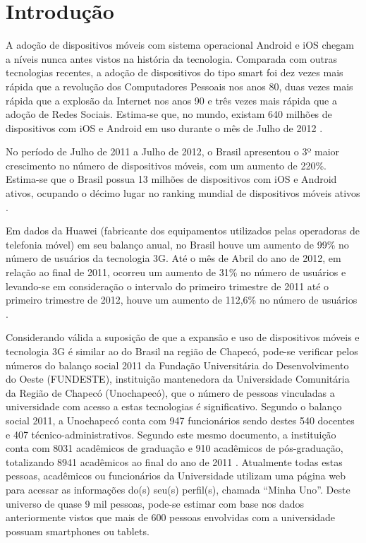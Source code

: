 \chapter{Introdução}

A adoção de dispositivos móveis com sistema operacional Android e iOS chegam a níveis nunca antes vistos na história da tecnologia. Comparada com outras tecnologias recentes, a adoção de dispositivos do tipo smart foi dez vezes mais rápida que a revolução dos Computadores Pessoais nos anos 80, duas vezes mais rápida que a explosão da Internet nos anos 90 e três vezes mais rápida que a adoção de Redes Sociais. Estima-se que, no mundo, existam 640 milhões de dispositivos com iOS e Android em uso durante o mês de Julho de 2012
\cite{flurry2012}.

No período de Julho de 2011 a Julho de 2012, o Brasil apresentou o 3º maior crescimento no número de dispositivos móveis, com um aumento de 220\%. Estima-se que o Brasil possua 13 milhões de dispositivos com iOS e Android ativos, ocupando o décimo lugar no ranking mundial de dispositivos móveis ativos
\cite{flurry2012}.

Em dados da Huawei (fabricante dos equipamentos utilizados pelas operadoras de telefonia móvel) em seu balanço anual, no Brasil houve um aumento de 99\% no número de usuários da tecnologia 3G. Até o mês de Abril do ano de 2012, em relação ao final de 2011, ocorreu um aumento de 31\% no número de usuários e levando-se em consideração o intervalo do primeiro trimestre de 2011 até o primeiro trimestre de 2012, houve um aumento de 112,6\% no número de usuários
\cite{Huawei1T2012}.

Considerando válida a suposição de que a expansão e uso de dispositivos móveis e tecnologia 3G é similar ao do Brasil na região de Chapecó, pode-se verificar pelos números do balanço social 2011 da Fundação Universitária do Desenvolvimento do Oeste (FUNDESTE), instituição mantenedora da Universidade Comunitária da Região de Chapecó (Unochapecó), que o número de pessoas vinculadas a universidade com acesso a estas tecnologias é significativo. Segundo o balanço social 2011, a Unochapecó conta com 947 funcionários sendo destes 540 docentes e 407 técnico-administrativos. Segundo este mesmo documento, a instituição conta com 8031 acadêmicos de graduação e 910 acadêmicos de pós-graduação, totalizando 8941 acadêmicos ao final do ano de 2011 \cite{Fundeste2011}. Atualmente todas estas pessoas, acadêmicos ou funcionários da Universidade utilizam uma página web para acessar as informações do(s) seu(s) perfil(s), chamada “Minha Uno''. Deste universo de quase 9 mil pessoas, pode-se estimar com base nos dados anteriormente vistos que mais de 600 pessoas envolvidas com a universidade possuam smartphones ou tablets.

